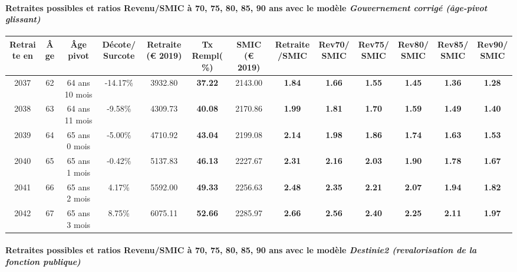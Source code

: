 \paragraph{Retraites possibles et ratios Revenu/SMIC à 70, 75, 80, 85, 90 ans avec le modèle \emph{Gouvernement corrigé (âge-pivot glissant)}}  
 
{ \scriptsize \begin{center} 
\begin{tabular}[htb]{|c|c||c|c||c|c||c||c|c|c|c|c|c|} 
\hline 
 Retraite en &  Âge &  Âge pivot &  Décote/Surcote &  Retraite (\euro{} 2019) &  Tx Rempl(\%) &  SMIC (\euro{} 2019) &  Retraite/SMIC &  Rev70/SMIC &  Rev75/SMIC &  Rev80/SMIC &  Rev85/SMIC &  Rev90/SMIC \\ 
\hline \hline 
 2037 &  62 &  64 ans 10 mois &  -14.17\% &  3932.80 &  {\bf 37.22} &  2143.00 &  {\bf 1.84} &  {\bf 1.66} &  {\bf 1.55} &  {\bf 1.45} &  {\bf 1.36} &  {\bf 1.28} \\ 
\hline 
 2038 &  63 &  64 ans 11 mois &  -9.58\% &  4309.73 &  {\bf 40.08} &  2170.86 &  {\bf 1.99} &  {\bf 1.81} &  {\bf 1.70} &  {\bf 1.59} &  {\bf 1.49} &  {\bf 1.40} \\ 
\hline 
 2039 &  64 &  65 ans 0 mois &  -5.00\% &  4710.92 &  {\bf 43.04} &  2199.08 &  {\bf 2.14} &  {\bf 1.98} &  {\bf 1.86} &  {\bf 1.74} &  {\bf 1.63} &  {\bf 1.53} \\ 
\hline 
 2040 &  65 &  65 ans 1 mois &  -0.42\% &  5137.83 &  {\bf 46.13} &  2227.67 &  {\bf 2.31} &  {\bf 2.16} &  {\bf 2.03} &  {\bf 1.90} &  {\bf 1.78} &  {\bf 1.67} \\ 
\hline 
 2041 &  66 &  65 ans 2 mois &  4.17\% &  5592.00 &  {\bf 49.33} &  2256.63 &  {\bf 2.48} &  {\bf 2.35} &  {\bf 2.21} &  {\bf 2.07} &  {\bf 1.94} &  {\bf 1.82} \\ 
\hline 
 2042 &  67 &  65 ans 3 mois &  8.75\% &  6075.11 &  {\bf 52.66} &  2285.97 &  {\bf 2.66} &  {\bf 2.56} &  {\bf 2.40} &  {\bf 2.25} &  {\bf 2.11} &  {\bf 1.97} \\ 
\hline 
\hline 
\end{tabular} 
\end{center} } 
\paragraph{Retraites possibles et ratios Revenu/SMIC à 70, 75, 80, 85, 90 ans avec le modèle \emph{Destinie2 (revalorisation de la fonction publique)}}  
 
